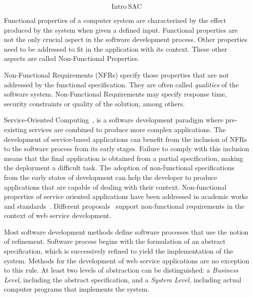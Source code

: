 \[ \mathrm{Intro\ SAC} \]

Functional properties of a computer system are characterized by the effect produced by the system when given a defined input.
Functional properties are not the only crucial aspect in the software development process. 
Other properties need to be addressed to fit in the application with its context.
These other aspects are called Non-Functional Properties.

Non-Functional Requirements (NFRs) specify those properties that are not addressed by the functional  specification.
They are often called \textit{qualities} of the software system.
Non-Functional Requirements may specify response time, security constraints or quality of the solution, among others.




Service-Oriented Computing~\cite{Papazoglou2007}, is a software development paradigm where pre-existing services are combined to produce more complex applications. 
The development of service-based applications can benefit from the inclusion of NFRs to the software process from its early stages.
Failure to comply with this inclusion means that the final application is obtained from a partial specification, making the deployment a difficult task.
The adoption of non-functional specifications from the early states of development
can help the developer to produce applications that are capable of dealing with
their context.
Non-functional properties of service oriented applications have been
addressed in academic works and standards~\cite{ws-co,ws-tra,wsci}.
Different proposals~\cite{Babamir2010,AgarwalLS09,CholletL09,GutierrezRF10,XiaoCZBOLH08,JeongCL09,TsadimasNA12}
support non-functional requirements in the context of web service development. 

Most software development methods define software processes that use the notion of refinement.
Software process begins with the formulation of an abstract specification, which is successively refined to yield the implementation of the system.
Methods for the development of web service applications are no exception to this rule.
At least two levels of abstraction can be distinguished: a \textit{Business Level}, including the abstract specification, and a \textit{System Level}, including actual computer programs that implements the system.

